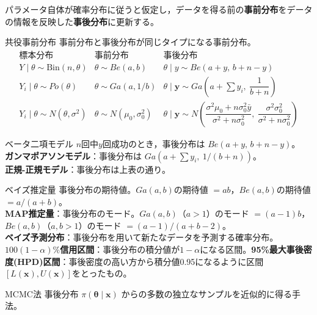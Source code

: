\documentclass[a4paper,11pt]{ltjsarticle}
\begin{document}
パラメータ自体が確率分布に従うと仮定し，データを得る前の\textbf{事前分布}をデータの情報を反映した\textbf{事後分布}に更新する。

\begin{term}{共役事前分布}
事前分布と事後分布が同じタイプになる事前分布。
\[
\begin{array}{lll}
\text{標本分布} & \text{事前分布} & \text{事後分布}\\\hline
Y\mid\theta\sim\mathrm{Bin}(n,\theta) & \theta\sim Be(a,b) & \theta\mid y\sim Be(a+y,\,b+n-y)\\
Y_i\mid\theta\sim Po(\theta) & \theta\sim Ga(a,1/b) & \theta\mid\bm y\sim Ga\!\left(a+\textstyle\sum y_i,\ \dfrac{1}{b+n}\right)\\
Y_i\mid\theta\sim N(\theta,\sigma^2) & \theta\sim N(\mu_0,\sigma_0^2) & \theta\mid\bm y\sim N\!\left(\dfrac{\sigma^2\mu_0+n\sigma_0^2\bar y}{\sigma^2+n\sigma_0^2},\ \dfrac{\sigma^2\sigma_0^2}{\sigma^2+n\sigma_0^2}\right)
\end{array}
\]
\end{term}

\begin{term}{ベータ二項モデル}
$n$回中$y$回成功のとき，事後分布は $Be(a+y,\,b+n-y)$。\\
\textbf{ガンマポアソンモデル}：事後分布は $Ga\!\left(a+\sum y_i,\ 1/(b+n)\right)$。\\
\textbf{正規-正規モデル}：事後分布は上表の通り。
\end{term}

\begin{term}{ベイズ推定量}
事後分布の期待値。$Ga(a,b)$の期待値 $=ab$，$Be(a,b)$の期待値 $=a/(a+b)$。\\
\textbf{MAP推定量}：事後分布のモード。$Ga(a,b)$（$a>1$）のモード $=(a-1)b$，$Be(a,b)$（$a,b>1$）のモード $=(a-1)/(a+b-2)$。\\
\textbf{ベイズ予測分布}：事後分布を用いて新たなデータを予測する確率分布。\\
\textbf{$100(1-\alpha)\%$信用区間}：事後分布の積分値が$1-\alpha$になる区間。\textbf{95\%最大事後密度(HPD)区間}：事後密度の高い方から積分値0.95になるように区間$[L(\bm x),U(\bm x)]$をとったもの。
\end{term}

\begin{term}{MCMC法}
事後分布 $\pi(\bm\theta\mid\bm x)$ からの多数の独立なサンプルを近似的に得る手法。
\end{term}
\end{document}
